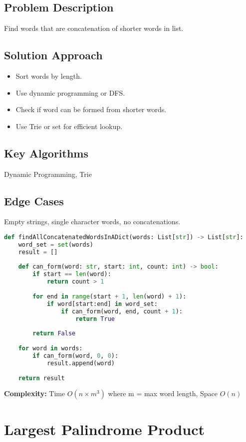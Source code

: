 \documentclass[10pt, a4paper]{article}
\begin{document}
\subsection*{Problem Description}
Find words that are concatenation of shorter words in list.

\subsection*{Solution Approach}
\begin{itemize}
    \item Sort words by length.
    \item Use dynamic programming or DFS.
    \item Check if word can be formed from shorter words.
    \item Use Trie or set for efficient lookup.
\end{itemize}

\subsection*{Key Algorithms}
Dynamic Programming, Trie

\subsection*{Edge Cases}
Empty strings, single character words, no concatenations.

\begin{lstlisting}[language=Python]
def findAllConcatenatedWordsInADict(words: List[str]) -> List[str]:
    word_set = set(words)
    result = []
    
    def can_form(word: str, start: int, count: int) -> bool:
        if start == len(word):
            return count > 1
        
        for end in range(start + 1, len(word) + 1):
            if word[start:end] in word_set:
                if can_form(word, end, count + 1):
                    return True
        
        return False
    
    for word in words:
        if can_form(word, 0, 0):
            result.append(word)
    
    return result
\end{lstlisting}
\textbf{Complexity:} Time $O(n \times m^3)$ where m = max word length, Space $O(n)$

\section{Largest Palindrome Product}
\end{document}
